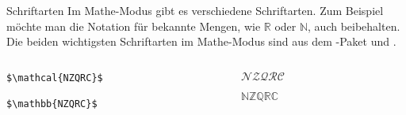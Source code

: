 \begin{frame}[fragile]{Schriftarten}
Im Mathe-Modus gibt es verschiedene Schriftarten. Zum Beispiel möchte man die Notation für bekannte Mengen, wie $\mathbb{R}$ oder $\mathbb{N}$, auch beibehalten. Die beiden wichtigsten Schriftarten im Mathe-Modus sind  aus dem -Paket und .
\begin{columns}
\begin{column}{0.55\textwidth}
\begin{codeblock}
\begin{verbatim}
$\mathcal{NZQRC}$

$\mathbb{NZQRC}$
\end{verbatim}
\end{codeblock}
\end{column}
\begin{column}{0.35\textwidth}
$\mathcal{NZQRC}$

\medskip
$\mathbb{NZQRC}$
\end{column}
\end{columns}
\end{frame}